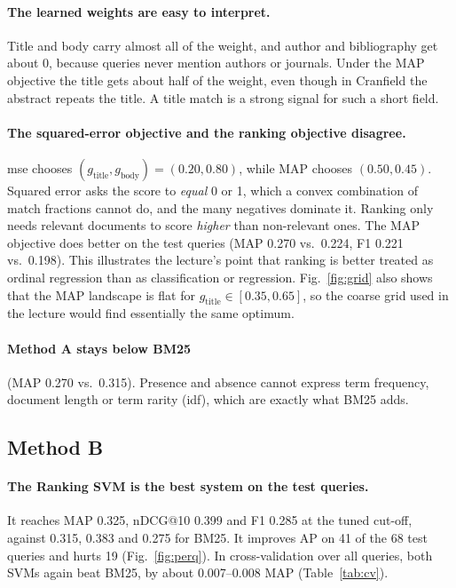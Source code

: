 \documentclass[11pt,a4paper]{article}
\begin{document}
\paragraph{The learned weights are easy to interpret.} Title and body carry almost all of
the weight, and author and bibliography get about 0, because queries never mention authors
or journals. Under the MAP objective the title gets about half of the weight, even though in
Cranfield the abstract repeats the title. A title match is a strong signal for such a short
field.

\paragraph{The squared-error objective and the ranking objective disagree.} mse chooses
$(g_\text{title}, g_\text{body}) = (0.20, 0.80)$, while MAP chooses $(0.50, 0.45)$.
Squared error asks the score to \emph{equal} 0 or 1, which a convex combination of match
fractions cannot do, and the many negatives dominate it. Ranking only needs relevant
documents to score \emph{higher} than non-relevant ones. The MAP objective does better on
the test queries (MAP 0.270 vs.\ 0.224, F1 0.221 vs.\ 0.198). This illustrates the lecture's
point that ranking is better treated as ordinal regression than as classification or
regression. Fig.~\ref{fig:grid} also shows that the MAP landscape is flat for
$g_\text{title} \in [0.35, 0.65]$, so the coarse grid used in the lecture would find
essentially the same optimum.

\paragraph{Method A stays below BM25} (MAP 0.270 vs.\ 0.315). Presence and absence cannot
express term frequency, document length or term rarity (idf), which are exactly what BM25
adds.

\subsection{Method B}

\paragraph{The Ranking SVM is the best system on the test queries.} It reaches MAP 0.325,
nDCG@10 0.399 and F1 0.285 at the tuned cut-off, against 0.315, 0.383 and 0.275 for BM25. It
improves AP on 41 of the 68 test queries and hurts 19 (Fig.~\ref{fig:perq}). In
cross-validation over all queries, both SVMs again beat BM25, by about 0.007--0.008 MAP
(Table~\ref{tab:cv}).
\end{document}
